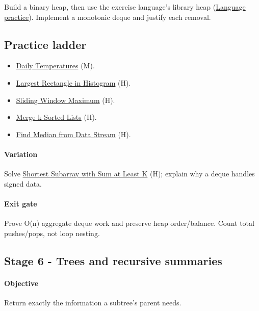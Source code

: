 \documentclass[11pt,letterpaper]{article}
\begin{document}
Build a binary heap, then use the exercise language's library heap (\hyperref[sec:24]{Language practice}). Implement a monotonic deque and justify each removal.

\subsection*{Practice ladder}

\begin{itemize}

\item \href{https://leetcode.com/problems/daily-temperatures/}{Daily Temperatures} (M).

\item \href{https://leetcode.com/problems/largest-rectangle-in-histogram/}{Largest Rectangle in Histogram} (H).

\item \href{https://leetcode.com/problems/sliding-window-maximum/}{Sliding Window Maximum} (H).

\item \href{https://leetcode.com/problems/merge-k-sorted-lists/}{Merge k Sorted Lists} (H).

\item \href{https://leetcode.com/problems/find-median-from-data-stream/}{Find Median from Data Stream} (H).

\end{itemize}

\paragraph*{Variation}

Solve \href{https://leetcode.com/problems/shortest-subarray-with-sum-at-least-k/}{Shortest Subarray with Sum at Least K} (H); explain why a deque handles signed data.

\paragraph*{Exit gate}

Prove O(n) aggregate deque work and preserve heap order/balance. Count total pushes/pops, not loop nesting.

\par{}
\begin{samepage}
\section{Stage 6 - Trees and recursive summaries}\label{sec:10}

\label{stage:6}


\paragraph*{Objective}

Return exactly the information a subtree's parent needs.

\end{samepage}
\end{document}
